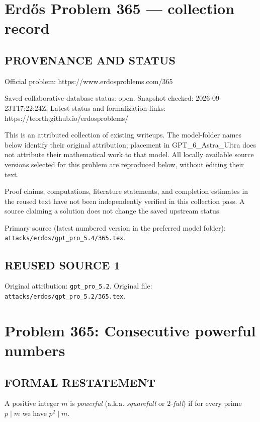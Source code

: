 \section*{Erd\H{o}s Problem 365 --- collection record}

\subsection*{PROVENANCE AND STATUS}
Official problem: https://www.erdosproblems.com/365

Saved collaborative-database status: open.
Snapshot checked: 2026-09-23T17:22:24Z.
Latest status and formalization links: https://teorth.github.io/erdosproblems/

This is an attributed collection of existing writeups. The model-folder names below identify their original attribution; placement in GPT\_6\_Astra\_Ultra does not attribute their mathematical work to that model. All locally available source versions selected for this problem are reproduced below, without editing their text.

Proof claims, computations, literature statements, and completion estimates in the reused text have not been independently verified in this collection pass. A source claiming a solution does not change the saved upstream status.

Primary source (latest numbered version in the preferred model folder): \texttt{attacks/erdos/gpt\_pro\_5.4/365.tex}.

\subsection*{REUSED SOURCE 1}
Original attribution: \texttt{gpt\_pro\_5.2}.
Original file: \texttt{attacks/erdos/gpt\_pro\_5.2/365.tex}.

\section*{Problem 365: Consecutive powerful numbers}

\subsection*{FORMAL RESTATEMENT}
A positive integer $m$ is \emph{powerful} (a.k.a. \emph{squarefull} or \emph{$2$-full}) if for every prime $p\mid m$ we have $p^2\mid m$.

